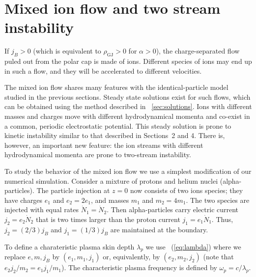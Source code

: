 
\section{Mixed ion flow and two stream instability}


If $j_B>0$ (which is equivalent to $\rho_\mathrm{GJ}>0$ for $\alpha>0$), the
charge-separated flow puled out from the polar cap is made of ions.
Different species of ions may end up in such a flow, and they will be
accelerated to different velocities.

The mixed ion flow shares many features with the identical-particle model
studied in the previous sections. Steady state solutions exist for such flows,
which can be obtained using the method described in \Sect~\ref{sec:solutions}.
Ions with different masses and charges move with different hydrodynamical
momenta and co-exist in a common, periodic electrostatic potential.
This steady solution
is prone to kinetic instability similar to that described in Sections~2 and 4.
%
There is, however, an important new feature: the ion streams with
different hydrodynamical momenta are prone to two-stream instability.

To study the behavior of the mixed ion flow we use a simplest modification of
our numerical simulation. Consider a mixture of protons and helium nuclei
(alpha-particles).
The particle injection at $z=0$ now consists of two ions species; they have
charges $e_1$ and $e_2=2e_1$, and masses $m_1$ and $m_2=4m_1$.
The two species are injected with equal rates $\dot{N}_1=\dot{N}_2$.
Then alpha-particles carry electric current $j_2=e_2\dot{N}_2$ that is
two times larger than the proton current $j_1=e_1\dot{N}_1$. Thus,
$j_2=(2/3)j_B$ and $j_1=(1/3)j_B$ are maintained at the boundary.

To define a charateristic plasma skin depth $\lambda_p$ we use
\Eq~(\ref{eq:lambda}) where we replace $e,m,j_B$ by $(e_1,m_1,j_1)$
or, equivalently, by $(e_2,m_2,j_2)$ (note that $e_2j_2/m_2=e_1j_1/m_1$).
The characteristic plasma frequency is defined by $\omega_p=c/\lambda_p$.


